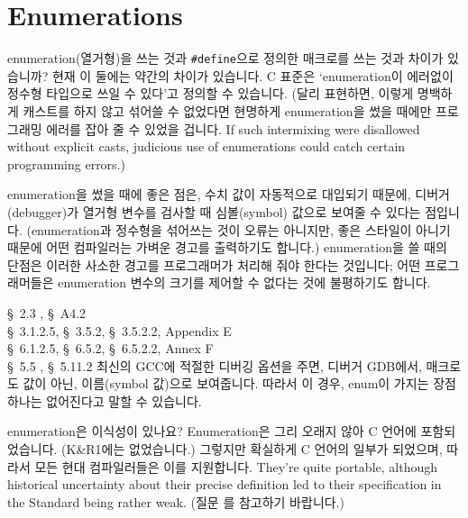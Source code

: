\section{Enumerations}

\begin{faq}
	enumeration(열거형)을 쓰는 것과 \verb+#define+으로 정의한
	매크로를 쓰는 것과 차이가 있습니까?
\A
	현재 이 둘에는 약간의 차이가 있습니다.  C 표준은 `enumeration이
	에러없이 정수형 타입으로 쓰일 수 있다'고 정의할 수 있습니다.
	(달리 표현하면, 이렇게 명백하게 캐스트를 하지 않고 섞어쓸 수 없었다면
	현명하게 enumeration을 썼을 때에만 프로그래밍 에러를 잡아 줄 수
	있었을 겁니다. If such intermixing were disallowed without explicit
        casts, judicious use of enumerations could catch certain programming
        errors.) %

	enumeration을 썼을 때에 좋은 점은, 수치 값이 자동적으로 대입되기 때문에,
	디버거(debugger)가 열거형 변수를 검사할 때 심볼(symbol) 값으로
	보여줄 수 있다는 점입니다.
	(enumeration과 정수형을 섞어쓰는 것이 오류는 아니지만, 좋은 스타일이 아니기
	때문에 어떤 컴파일러는 가벼운 경고를 출력하기도 합니다.)
	enumeration을 쓸 때의 단점은 이러한 사소한 경고를 프로그래머가 처리해 줘야
	한다는 것입니다; 어떤 프로그래머들은 enumeration 변수의 크기를 제어할 수
	없다는 것에 불평하기도 합니다.

\R
	\cite{kr2} \S\ 2.3 , \S\ A4.2  \\
        \cite{ansi} \S\ 3.1.2.5, \S\ 3.5.2, \S\ 3.5.2.2, Appendix E \\
	\cite{c89} \S\ 6.1.2.5, \S\ 6.5.2, \S\ 6.5.2.2, Annex F \\
	\cite{hs} \S\ 5.5 , \S\ 5.11.2 
\T
	최신의 GCC에 적절한 디버깅 옵션을 주면, 디버거 GDB에서, 매크로도 
        값이 아닌, 이름(symbol 값)으로 보여줍니다.  따라서 이 경우, enum이 
        가지는 장점 하나는 없어진다고 말할 수 있습니다.
\end{faq}

\begin{faq}
        enumeration은 이식성이 있나요?
\A
        Enumeration은 그리 오래지 않아 C 언어에 포함되었습니다. (K\&R1에는
        없었습니다.) 그렇지만 확실하게 C 언어의 일부가 되었으며, 따라서 모든 현대
        컴파일러들은 이를 지원합니다. They're quite portable, although historical
        uncertainty about their precise definition led to their specification
        in the Standard being rather weak. (질문 를 참고하기 바랍니다.)
\end{faq}

